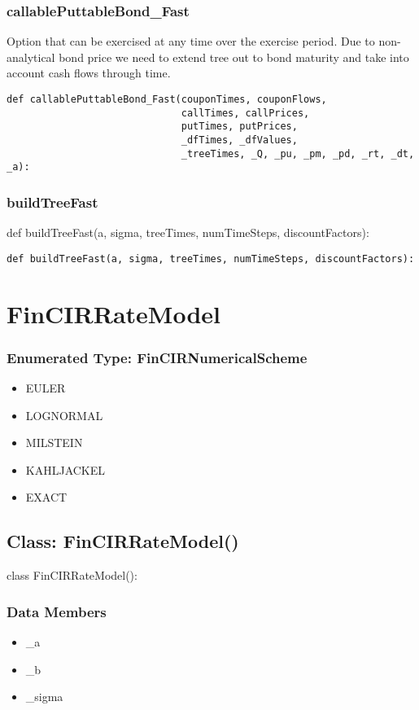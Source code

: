 \documentclass[twoside,11pt]{book}
\begin{document}
\subsubsection*{{\bf callablePuttableBond\_Fast}}
Option that can be exercised at any time over the exercise period. Due to non-analytical bond price we need to extend tree out to bond maturity and take into account cash flows through time.  

\begin{lstlisting}
def callablePuttableBond_Fast(couponTimes, couponFlows,
                              callTimes, callPrices,
                              putTimes, putPrices,
                              _dfTimes, _dfValues,
                              _treeTimes, _Q, _pu, _pm, _pd, _rt, _dt, _a):
\end{lstlisting}

\subsubsection*{{\bf buildTreeFast}}
def buildTreeFast(a, sigma, treeTimes, numTimeSteps, discountFactors): 

\begin{lstlisting}
def buildTreeFast(a, sigma, treeTimes, numTimeSteps, discountFactors):
\end{lstlisting}

\newpage
\section{FinCIRRateModel}

\subsubsection{Enumerated Type: FinCIRNumericalScheme}
\begin{itemize}
\item{EULER}
\item{LOGNORMAL}
\item{MILSTEIN}
\item{KAHLJACKEL}
\item{EXACT}
\end{itemize}

\subsection*{Class: FinCIRRateModel()}
class FinCIRRateModel(): 

\subsubsection*{Data Members}
\begin{itemize}
\item{\_a}
\item{\_b}
\item{\_sigma}
\end{itemize}
\end{document}
